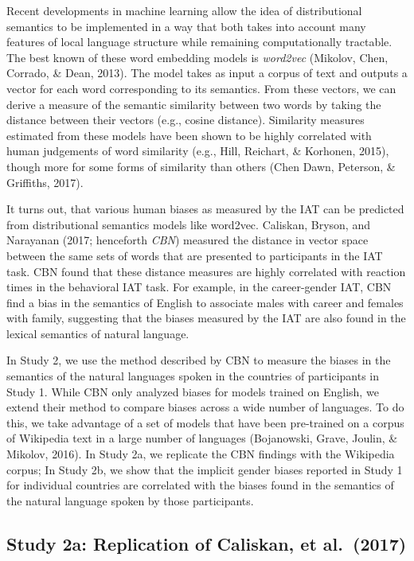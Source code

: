 \documentclass[10pt, letterpaper]{article}
\begin{document}
Recent developments in machine learning allow the idea of distributional
semantics to be implemented in a way that both takes into account many
features of local language structure while remaining computationally
tractable. The best known of these word embedding models is
\emph{word2vec} (Mikolov, Chen, Corrado, \& Dean, 2013). The model takes
as input a corpus of text and outputs a vector for each word
corresponding to its semantics. From these vectors, we can derive a
measure of the semantic similarity between two words by taking the
distance between their vectors (e.g., cosine distance). Similarity
measures estimated from these models have been shown to be highly
correlated with human judgements of word similarity (e.g., Hill,
Reichart, \& Korhonen, 2015), though more for some forms of similarity
than others (Chen Dawn, Peterson, \& Griffiths, 2017).

It turns out, that various human biases as measured by the IAT can be
predicted from distributional semantics models like word2vec. Caliskan,
Bryson, and Narayanan (2017; henceforth \emph{CBN}) measured the
distance in vector space between the same sets of words that are
presented to participants in the IAT task. CBN found that these distance
measures are highly correlated with reaction times in the behavioral IAT
task. For example, in the career-gender IAT, CBN find a bias in the
semantics of English to associate males with career and females with
family, suggesting that the biases measured by the IAT are also found in
the lexical semantics of natural language.

In Study 2, we use the method described by CBN to measure the biases in
the semantics of the natural languages spoken in the countries of
participants in Study 1. While CBN only analyzed biases for models
trained on English, we extend their method to compare biases across a
wide number of languages. To do this, we take advantage of a set of
models that have been pre-trained on a corpus of Wikipedia text in a
large number of languages (Bojanowski, Grave, Joulin, \& Mikolov, 2016).
In Study 2a, we replicate the CBN findings with the Wikipedia corpus; In
Study 2b, we show that the implicit gender biases reported in Study 1
for individual countries are correlated with the biases found in the
semantics of the natural language spoken by those participants.

\subsection{Study 2a: Replication of Caliskan, et
al.~(2017)}\label{study-2a-replication-of-caliskan-et-al.2017}
\end{document}
